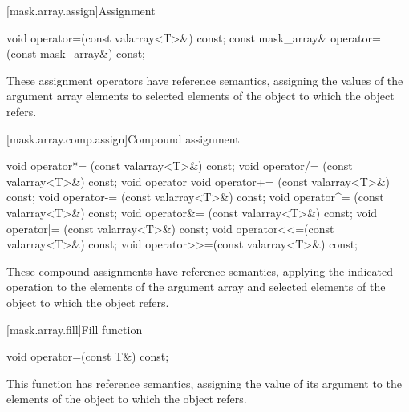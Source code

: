 [mask.array.assign]{Assignment}

%
\begin{itemdecl}
void operator=(const valarray<T>&) const;
const mask_array& operator=(const mask_array&) const;
\end{itemdecl}

\begin{itemdescr}
\pnum
These assignment operators have reference semantics, assigning the values
of the argument array elements to selected elements of the
object to which the  object refers.
\end{itemdescr}

[mask.array.comp.assign]{Compound assignment}

%
%
%
%
%
%
%
%
%
%
\begin{itemdecl}
void operator*= (const valarray<T>&) const;
void operator/= (const valarray<T>&) const;
void operator%
void operator+= (const valarray<T>&) const;
void operator-= (const valarray<T>&) const;
void operator^= (const valarray<T>&) const;
void operator&= (const valarray<T>&) const;
void operator|= (const valarray<T>&) const;
void operator<<=(const valarray<T>&) const;
void operator>>=(const valarray<T>&) const;
\end{itemdecl}

\begin{itemdescr}
\pnum
These compound assignments have reference semantics, applying the
indicated operation to the elements of the argument array and selected elements
of the
object to which the  object refers.
\end{itemdescr}

[mask.array.fill]{Fill function}

%
\begin{itemdecl}
void operator=(const T&) const;
\end{itemdecl}

\begin{itemdescr}
\pnum
This function has reference semantics, assigning the value of its
argument to the elements of the
object to which the
object refers.
\end{itemdescr}

